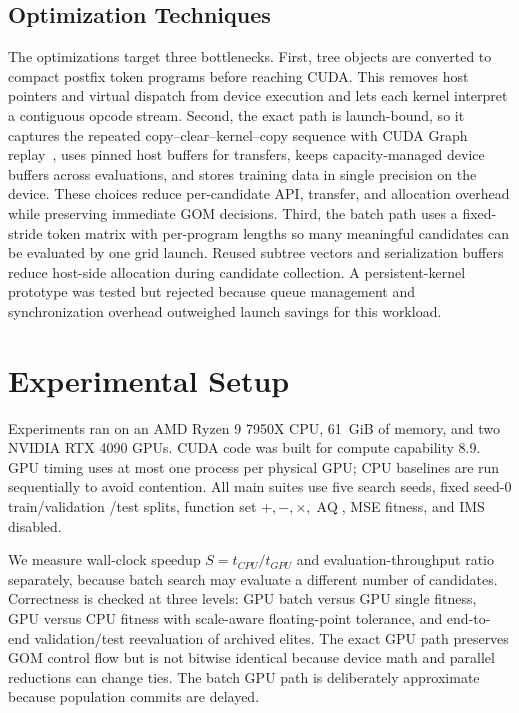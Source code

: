\documentclass[conference]{IEEEtran}
\newcommand{\aq}{\operatorname{AQ}}
\begin{document}
\subsection{Optimization Techniques}

The optimizations target three bottlenecks. First, tree objects are converted to
compact postfix token programs before reaching CUDA. This removes host pointers
and virtual dispatch from device execution and lets each kernel interpret a
contiguous opcode stream. Second, the exact path is launch-bound, so it captures
the repeated copy--clear--kernel--copy sequence with CUDA Graph replay~\cite{nvidiacuda}, uses
pinned host buffers for transfers, keeps capacity-managed device buffers across
evaluations, and stores training data in single precision on the device. These
choices reduce per-candidate API, transfer, and allocation overhead while
preserving immediate GOM decisions. Third, the batch path uses a fixed-stride
token matrix with per-program lengths so many meaningful candidates can be
evaluated by one grid launch. Reused subtree vectors and serialization buffers
reduce host-side allocation during candidate collection. A persistent-kernel
prototype was tested but rejected because queue management and synchronization
overhead outweighed launch savings for this workload.

\section{Experimental Setup}

Experiments ran on an AMD Ryzen 9 7950X CPU, 61~GiB of memory, and two NVIDIA
RTX 4090 GPUs. CUDA code was built for compute capability 8.9. GPU timing uses
at most one process per physical GPU; CPU baselines are run sequentially to avoid
contention. All main suites use five search seeds, fixed seed-0 train/validation
/test splits, function set \(+,-,\times,\aq\), MSE fitness, and IMS disabled.

We measure wall-clock speedup \(S=t_{CPU}/t_{GPU}\) and evaluation-throughput
ratio separately, because batch search may evaluate a different number of
candidates. Correctness is checked at three levels: GPU batch versus GPU single
fitness, GPU versus CPU fitness with scale-aware floating-point tolerance, and
end-to-end validation/test reevaluation of archived elites. The exact GPU path
preserves GOM control flow but is not bitwise identical because device math and
parallel reductions can change ties. The batch GPU path is deliberately
approximate because population commits are delayed.
\end{document}
